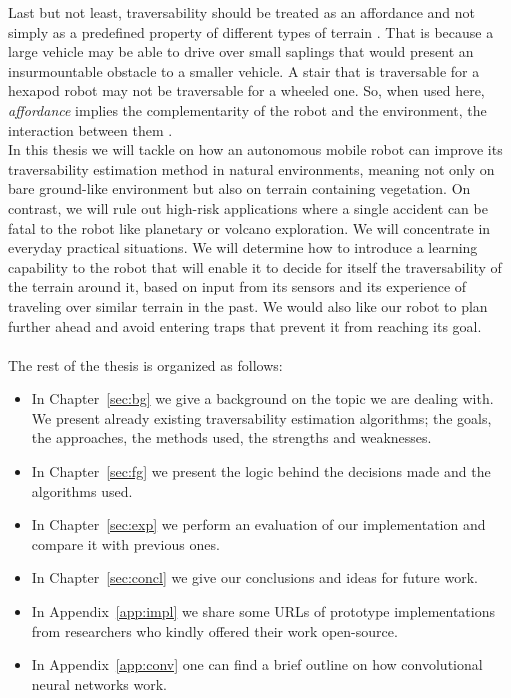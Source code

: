 \documentclass[12pt,a4paper,table,dvipsnames,tikz]{report}
\newcommand{\term}{\textit}
\newcommand{\acronym}{\MakeUppercase}
\begin{document}
	Last but not least, traversability should be treated as an affordance and 
	not simply as a predefined property of different types of terrain \citep{Kim}. 
	That is because a large vehicle may be able to drive over small saplings that 
	would present an insurmountable obstacle to a smaller vehicle. A stair that is 
	traversable for a hexapod robot may not be traversable for a wheeled one. So, 
	when used here, \term{affordance} implies the complementarity of the robot and 
	the environment, the interaction between them \citep{Ugur}.
	\\
	
	In this thesis we will tackle on how an autonomous mobile robot can improve its 
	traversability estimation method in natural environments, meaning not 
	only on bare ground-like environment but also on terrain containing vegetation. 
	On contrast, we will rule out high-risk applications where a single accident can 
	be fatal to the robot like planetary or volcano exploration. We will concentrate 
	in everyday practical situations. We will determine how to introduce a learning 
	capability to the robot that will enable it to decide for itself the 
	traversability of the terrain around it, based on input from its sensors 
	and its experience of traveling over similar terrain in the past. We would also 
	like our robot to plan further ahead and avoid entering traps that prevent it 
	from reaching its goal.
	\\\\
	
	The rest of the thesis is organized as follows:
	\begin{itemize}
		\item In Chapter~\ref{sec:bg} we give a background on the topic we are dealing 
		with. We present already existing traversability estimation algorithms; the 
		goals, the approaches, the methods used, the strengths and weaknesses. 
		\item In Chapter~\ref{sec:fg} we present the logic behind the decisions made 
		and the algorithms used.
		\item In Chapter~\ref{sec:exp} we perform an evaluation of our implementation 
		and compare it with previous ones.
		\item In Chapter~\ref{sec:concl} we give our conclusions and ideas for future 
		work.
		\item In Appendix~\ref{app:impl} we share some \acronym{url}s of prototype 
		implementations from researchers who kindly offered their work open-source.
		\item In Appendix~\ref{app:conv} one can find a brief outline on how 
		convolutional neural networks work.
	\end{itemize}
	
\end{document}
